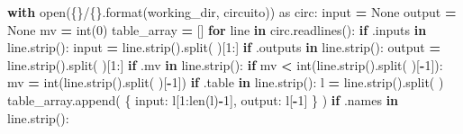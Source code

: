 \documentclass[
]{book}
\newenvironment{Shaded}{\begin{snugshade}}{\end{snugshade}}
\newcommand{\BuiltInTok}[1]{#1}
\newcommand{\ControlFlowTok}[1]{\textcolor[rgb]{0.13,0.29,0.53}{\textbf{#1}}}
\newcommand{\DecValTok}[1]{\textcolor[rgb]{0.00,0.00,0.81}{#1}}
\newcommand{\ImportTok}[1]{#1}
\newcommand{\KeywordTok}[1]{\textcolor[rgb]{0.13,0.29,0.53}{\textbf{#1}}}
\newcommand{\NormalTok}[1]{#1}
\newcommand{\OperatorTok}[1]{\textcolor[rgb]{0.81,0.36,0.00}{\textbf{#1}}}
\newcommand{\SpecialCharTok}[1]{\textcolor[rgb]{0.00,0.00,0.00}{#1}}
\newcommand{\StringTok}[1]{\textcolor[rgb]{0.31,0.60,0.02}{#1}}
\newcommand{\VariableTok}[1]{\textcolor[rgb]{0.00,0.00,0.00}{#1}}
\begin{document}
\begin{Shaded}
\begin{Highlighting}[]
\ControlFlowTok{with} \BuiltInTok{open}\NormalTok{(}\StringTok{\textquotesingle{}}\SpecialCharTok{\{\}}\StringTok{/}\SpecialCharTok{\{\}}\StringTok{\textquotesingle{}}\NormalTok{.}\BuiltInTok{format}\NormalTok{(working\_dir, circuito)) }\ImportTok{as}\NormalTok{ circ:}
  \BuiltInTok{input} \OperatorTok{=} \VariableTok{None}
\NormalTok{  output }\OperatorTok{=} \VariableTok{None}
\NormalTok{  mv }\OperatorTok{=} \BuiltInTok{int}\NormalTok{(}\DecValTok{0}\NormalTok{)}
\NormalTok{  table\_array }\OperatorTok{=}\NormalTok{ []}
  \ControlFlowTok{for}\NormalTok{ line }\KeywordTok{in}\NormalTok{ circ.readlines():}
    \ControlFlowTok{if} \StringTok{\textquotesingle{}.inputs\textquotesingle{}} \KeywordTok{in}\NormalTok{ line.strip():}
      \BuiltInTok{input} \OperatorTok{=}\NormalTok{ line.strip().split(}\StringTok{\textquotesingle{} \textquotesingle{}}\NormalTok{)[}\DecValTok{1}\NormalTok{:]}
    \ControlFlowTok{if} \StringTok{\textquotesingle{}.outputs\textquotesingle{}} \KeywordTok{in}\NormalTok{ line.strip():}
\NormalTok{      output }\OperatorTok{=}\NormalTok{ line.strip().split(}\StringTok{\textquotesingle{} \textquotesingle{}}\NormalTok{)[}\DecValTok{1}\NormalTok{:]}
    \ControlFlowTok{if} \StringTok{\textquotesingle{}.mv\textquotesingle{}} \KeywordTok{in}\NormalTok{ line.strip():}
      \ControlFlowTok{if}\NormalTok{ mv }\OperatorTok{\textless{}} \BuiltInTok{int}\NormalTok{(line.strip().split(}\StringTok{\textquotesingle{} \textquotesingle{}}\NormalTok{)[}\OperatorTok{{-}}\DecValTok{1}\NormalTok{]):}
\NormalTok{        mv }\OperatorTok{=} \BuiltInTok{int}\NormalTok{(line.strip().split(}\StringTok{\textquotesingle{} \textquotesingle{}}\NormalTok{)[}\OperatorTok{{-}}\DecValTok{1}\NormalTok{])}
    \ControlFlowTok{if} \StringTok{\textquotesingle{}.table\textquotesingle{}} \KeywordTok{in}\NormalTok{ line.strip():}
\NormalTok{      l }\OperatorTok{=}\NormalTok{ line.strip().split(}\StringTok{\textquotesingle{} \textquotesingle{}}\NormalTok{)}
\NormalTok{      table\_array.append(}
\NormalTok{        \{}
          \StringTok{\textquotesingle{}input\textquotesingle{}}\NormalTok{:    l[}\DecValTok{1}\NormalTok{:}\BuiltInTok{len}\NormalTok{(l)}\OperatorTok{{-}}\DecValTok{1}\NormalTok{],}
          \StringTok{\textquotesingle{}output\textquotesingle{}}\NormalTok{:   l[}\OperatorTok{{-}}\DecValTok{1}\NormalTok{]}
\NormalTok{        \}}
\NormalTok{      )}
    \ControlFlowTok{if} \StringTok{\textquotesingle{}.names\textquotesingle{}} \KeywordTok{in}\NormalTok{ line.strip():}

\end{Highlighting}
\end{Shaded}
\end{document}
